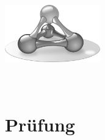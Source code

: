 \documentclass[12pt]{article}
\newcommand{\titleblock}{
  \includegraphics[height=2.5cm,width=\textwidth,keepaspectratio]{../lib/logo-sw}
  \section*{\courseacronym \xspace \coursesemester \\ Prüfung}
}
\begin{document}
\twocolumn
\centering
\titleblock
{}
\begin{supertabular}{rrr}

\end{supertabular}
\end{document}
